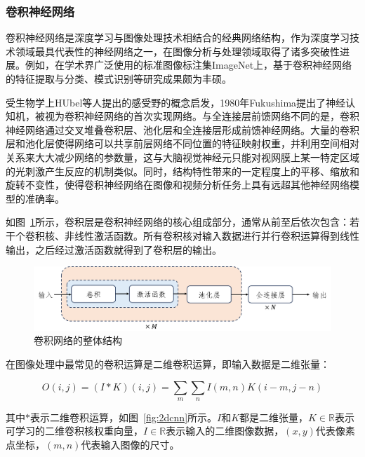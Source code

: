 \subsubsection{卷积神经网络}


卷积神经网络是深度学习与图像处理技术相结合的经典网络结构，作为深度学习技术领域最具代表性的神经网络之一，在图像分析与处理领域取得了诸多突破性进展。例如，在学术界广泛使用的标准图像标注集ImageNet上，基于卷积神经网络的特征提取与分类、模式识别等研究成果颇为丰硕。

受生物学上HUbel等人\cite{hubel1962}提出的感受野的概念启发，1980年Fukushima\cite{fukushima1980}提出了神经认知机，被视为卷积神经网络的首次实现网络。与全连接层前馈网络不同的是，卷积神经网络通过交叉堆叠卷积层、池化层和全连接层形成前馈神经网络。大量的卷积层和池化层使得网络可以共享前层网络不同位置的特征映射权重，并利用空间相对关系来大大减少网络的参数量，这与大脑视觉神经元只能对视网膜上某一特定区域的光刺激产生反应的机制类似。同时，结构特性带来的一定程度上的平移、缩放和旋转不变性，使得卷积神经网络在图像和视频分析任务上具有远超其他神经网络模型的准确率。

如图~\ref{fig:cnn}所示，卷积层是卷积神经网络的核心组成部分，通常从前至后依次包含：若干个卷积核、非线性激活函数。所有卷积核对输入数据进行并行卷积运算得到线性输出，之后经过激活函数就得到了卷积层的输出\cite{Goodfellow-et-al-2016}。

\begin{figure}[htbp]
    \centering
    \includegraphics[width=\textwidth]{fig/cnn_frame.png}
    \caption{卷积网络的整体结构}
    \label{fig:cnn}
\end{figure}

在图像处理中最常见的卷积运算是二维卷积运算，即输入数据是二维张量：

\[
    O(i, j)=(I * K)(i, j)=\sum_{m} \sum_{n} I(m, n) K(i-m, j-n)
\]

其中$*$表示二维卷积运算，如图~\ref{fig:2dcnn}所示。$I$和$K$都是二维张量，$ K \in \mathbb{R}$表示可学习的二维卷积核权重向量，$I \in \mathbb{R}$表示输入的二维图像数据，$(x, y)$代表像素点坐标，$(m, n)$代表输入图像的尺寸。


